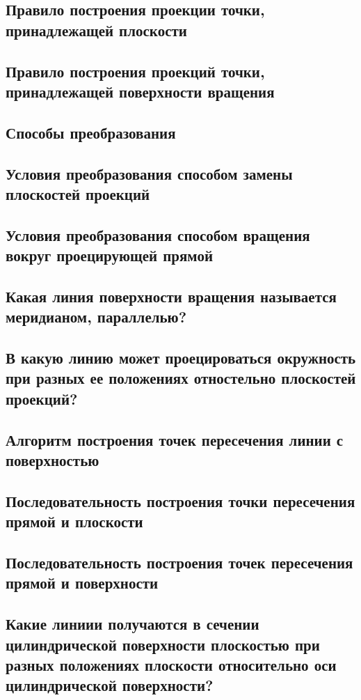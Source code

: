 \subsection{Правило построения проекции точки, принадлежащей плоскости}
\subsection{Правило построения проекций точки, принадлежащей поверхности вращения}
\subsection{Способы преобразования}
\subsection{Условия преобразования способом замены плоскостей проекций}
\subsection{Условия преобразования способом вращения вокруг проецирующей прямой}
\subsection{Какая линия поверхности вращения называется меридианом, параллелью?}
\subsection{В какую линию может проецироваться окружность при разных ее положениях отностельно плоскостей проекций?}
\subsection{Алгоритм построения точек пересечения линии с поверхностью}
\subsection{Последовательность построения точки пересечения прямой и плоскости}
\subsection{Последовательность построения точек пересечения прямой и поверхности}
\subsection{Какие линиии получаются в сечении цилиндрической поверхности плоскостью при разных положениях плоскости относительно оси цилиндрической поверхности?}
